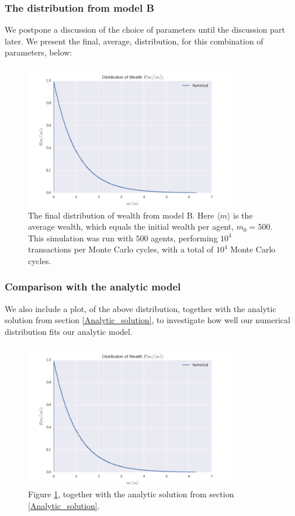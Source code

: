 \documentclass[a4paper, 10pt]{article}
\begin{document}
\subsubsection{The distribution from model B}
We postpone a discussion of the choice of parameters until the discussion part later. We present the final, average, distribution, for this combination of parameters, below:
\begin{figure}[!ht]
\centering
\includegraphics[height=2.5in]{distLamb0.png} %
\caption{The final distribution of wealth from model B. Here $\langle m \rangle$ is the average wealth, which equals the initial wealth per agent, $m_0=500$. This simulation was run with $500$ agents, performing $10^4$ transactions per Monte Carlo cycles, with a total of $10^4$ Monte Carlo cycles.}\label{fig:ModelB_final_distribution}
\end{figure}
\subsubsection{Comparison with the analytic model}
We also include a plot, of the above distribution, together with the analytic solution from section \ref{Analytic_solution}, to investigate how well our numerical distribution fits our analytic model.
\begin{figure}[!ht]
\centering
\includegraphics[height=2.5in]{distLamb0.png} %
\caption{Figure \ref{fig:ModelB_final_distribution}, together with the analytic solution from section \ref{Analytic_solution}.}\label{fig:ModelB_final_distribution_with_analytic}
\end{figure}
\end{document}
